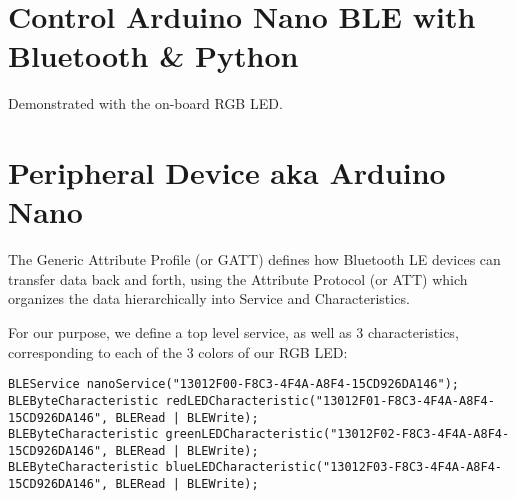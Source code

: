 \begin{center}
    
\end{center}


\section{Control Arduino Nano BLE with Bluetooth \& Python}



Demonstrated with the on-board RGB LED.

\section{Peripheral Device aka Arduino Nano}


The Generic Attribute Profile (or GATT) defines how Bluetooth LE devices can transfer data back and forth, using the Attribute Protocol (or ATT) which organizes the data hierarchically into Service and Characteristics.

For our purpose, we define a top level service, as well as 3 characteristics, corresponding to each of the 3 colors of our RGB LED:


\begin{lstlisting}
BLEService nanoService("13012F00-F8C3-4F4A-A8F4-15CD926DA146"); 
BLEByteCharacteristic redLEDCharacteristic("13012F01-F8C3-4F4A-A8F4-15CD926DA146", BLERead | BLEWrite);
BLEByteCharacteristic greenLEDCharacteristic("13012F02-F8C3-4F4A-A8F4-15CD926DA146", BLERead | BLEWrite);
BLEByteCharacteristic blueLEDCharacteristic("13012F03-F8C3-4F4A-A8F4-15CD926DA146", BLERead | BLEWrite);
\end{lstlisting}

